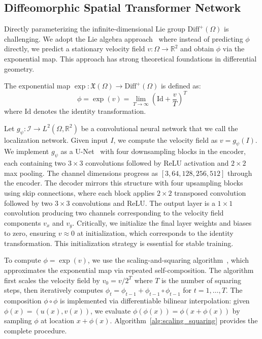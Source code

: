 \subsection{Diffeomorphic Spatial Transformer Network}
\label{subsec:diffeomorphic}

Directly parameterizing the infinite-dimensional Lie group $\text{Diff}^+(\Omega)$ is challenging. We adopt the Lie algebra approach~\cite{arsigny2006logdiff,voxelmorph} where instead of predicting $\phi$ directly, we predict a stationary velocity field $v: \Omega \rightarrow \mathbb{R}^2$ and obtain $\phi$ via the exponential map. This approach has strong theoretical foundations in differential geometry.

\begin{definition}
\label{def:exp_map}
The exponential map $\exp: \mathfrak{X}(\Omega) \rightarrow \text{Diff}^+(\Omega)$ is defined as:
\begin{equation}
\phi = \exp(v) = \lim_{T \rightarrow \infty} \left( \text{Id} + \frac{v}{T} \right)^T
\end{equation}
where $\text{Id}$ denotes the identity transformation.
\end{definition}

Let $g_\psi: \mathcal{I} \rightarrow L^2(\Omega, \mathbb{R}^2)$ be a convolutional neural network that we call the localization network. Given input $I$, we compute the velocity field as $v = g_\psi(I)$. We implement $g_\psi$ as a U-Net~\cite{ronneberger2015unet} with four downsampling blocks in the encoder, each containing two $3 \times 3$ convolutions followed by ReLU activation and $2 \times 2$ max pooling. The channel dimensions progress as $[3, 64, 128, 256, 512]$ through the encoder. The decoder mirrors this structure with four upsampling blocks using skip connections, where each block applies $2 \times 2$ transposed convolution followed by two $3 \times 3$ convolutions and ReLU. The output layer is a $1 \times 1$ convolution producing two channels corresponding to the velocity field components $v_x$ and $v_y$. Critically, we initialize the final layer weights and biases to zero, ensuring $v \approx 0$ at initialization, which corresponds to the identity transformation. This initialization strategy is essential for stable training.

To compute $\phi = \exp(v)$, we use the scaling-and-squaring algorithm~\cite{arsigny2006logdiff}, which approximates the exponential map via repeated self-composition. The algorithm first scales the velocity field by $v_0 = v / 2^T$ where $T$ is the number of squaring steps, then iteratively computes $\phi_t = \phi_{t-1} + \phi_{t-1} \circ \phi_{t-1}$ for $t = 1, \ldots, T$. The composition $\phi \circ \phi$ is implemented via differentiable bilinear interpolation: given $\phi(x) = (u(x), v(x))$, we evaluate $\phi(\phi(x)) = \phi(x + \phi(x))$ by sampling $\phi$ at location $x + \phi(x)$. Algorithm~\ref{alg:scaling_squaring} provides the complete procedure.

